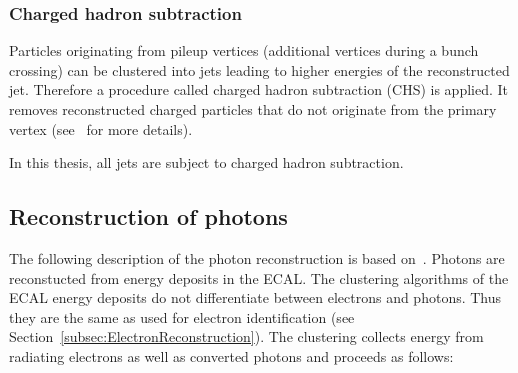 \subsubsection*{Charged hadron subtraction}
Particles originating from pileup vertices (additional vertices during a bunch crossing) can be clustered into jets leading to higher energies of the reconstructed jet.
Therefore a procedure called charged hadron subtraction (CHS) is applied.
It removes reconstructed charged particles that do not originate from the primary vertex (see~\cite{bib:CHS_2012} for more details).

In this thesis, all jets are subject to charged hadron subtraction.


\subsection{Reconstruction of photons}
The following description of the photon reconstruction is based on~\cite{bib:CMS:PhotonIdentification_8TeV}.
Photons are reconstucted from energy deposits in the ECAL.
The clustering algorithms of the ECAL energy deposits do not differentiate between electrons and photons.
Thus they are the same as used for electron identification (see Section~\ref{subsec:ElectronReconstruction}).
The clustering collects energy from radiating electrons as well as converted photons and proceeds as follows:



